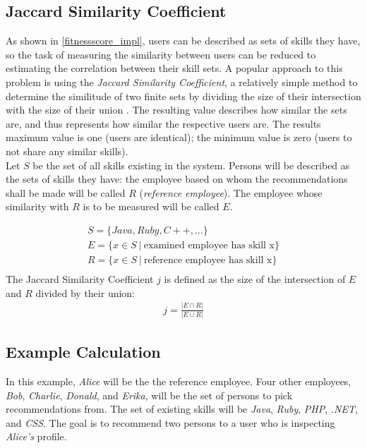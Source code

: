 \subsection{Jaccard Similarity Coefficient}
As shown in \ref{fitnessscore_impl}, users can be described as sets of skills they have, so the task of measuring the similarity between users can be reduced to estimating the correlation between their skill sets. A popular approach to this problem is using the \textit{Jaccard Similarity Coefficient}, a relatively simple method to determine the similitude of two finite sets by dividing the size of their intersection with the size of their union \cite{jaccard}. The resulting value describes how similar the sets are, and thus represents how similar the respective users are. The results maximum value is one (users are identical); the minimum value is zero (users to not share any similar skills).\\
Let $S$ be the set of all skills existing in the system. Persons will be described as the sets of skills they have: the employee based on whom the recommendations shall be made will be called $R$ (\textit{reference employee}). The employee whose similarity with $R$ is to be measured will be called $E$.

\begin{gather*}
	S = \{Java, Ruby, C++, ...\} \\
	E = \{x \in S \ | \ \textrm{examined employee has skill x}\} \\
	R = \{x \in S \ | \ \textrm{reference employee has skill x}\} \\
\end{gather*}
The Jaccard Similarity Coefficient $j$ is defined as the size of the intersection of $E$ and $R$ divided by their union:
\begin{gather*}
	j = \frac{|E \cap R|}{|E \cup R|}
\end{gather*}

\subsection{Example Calculation}
In this example, \textit{Alice} will be the the reference employee. Four other employees, \textit{Bob}, \textit{Charlie}, \textit{Donald}, and \textit{Erika}, will be the set of persons to pick recommendations from. The set of existing skills will be \textit{Java}, \textit{Ruby}, \textit{PHP}, \textit{.NET}, and \textit{CSS}.
The goal is to recommend two persons to a user who is inspecting \textit{Alice's} profile.\\

